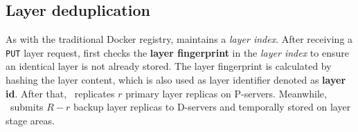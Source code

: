 \subsection{Layer deduplication}
\label{sec:dedup-desgin}

%
%

As with the traditional Docker registry, 
\sysname maintains a \emph{layer index}.
After receiving a \texttt{PUT} layer request,
\sysname first checks the \textbf{layer fingerprint} in the \emph{layer index} to ensure 
an identical layer is not already stored.
The layer fingerprint is calculated by hashing the layer content, which is also used as layer identifier denoted as \textbf{layer id}.
After that, \sysname~replicates $r$ primary layer replicas on P-servers. 
Meanwhile, \sysname~submits $R-r$ backup layer replicas to D-servers and temporally stored on layer stage areas.

 
